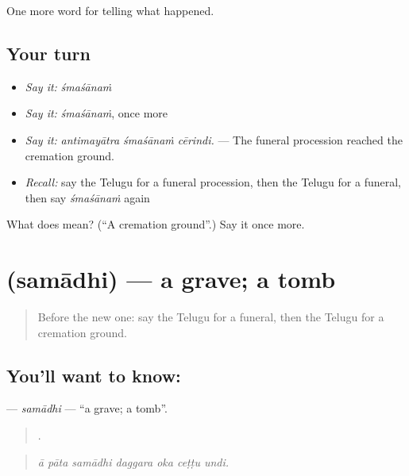 \begin{grammarlens}[title={What you've built}]
One more word for telling what happened.
\end{grammarlens}

\subsection*{Your turn}
\begin{itemize}
\raggedright
  \item \emph{Say it:} \emph{śmaśānaṁ}
  \item \emph{Say it:} \emph{śmaśānaṁ}, once more
  \item \emph{Say it:} \emph{antimayātra śmaśānaṁ cērindi.} — The funeral procession reached the cremation ground.
  \item \emph{Recall:} say the Telugu for a funeral procession, then the Telugu for a funeral, then say \emph{śmaśānaṁ} again
\end{itemize}

\begin{tcolorbox}[breakable,colback=teal!4,colframe=teal!35!black,title={Before you move on}]
What does  mean? (\textquotedblleft{}A cremation ground\textquotedblright{}.) Say it once more.
\end{tcolorbox}
\section[\texorpdfstring{\te{సమాధి} (samādhi)}{సమాధి (samādhi)}]{ (samādhi) — a grave; a tomb}

\label{lesson:TE-C345-samadhi}



\begin{quote}
Before the new one: say the Telugu for a funeral, then the Telugu for a cremation ground.
\end{quote}

\subsection*{You'll want to know: }
\textbf{} — \emph{samādhi} — \textquotedblleft{}a grave; a tomb\textquotedblright{}.

\begin{quote}
      .
\end{quote}

\begin{quote}
\emph{ā pāta samādhi daggara oka ceṭṭu undi.}
\end{quote}

